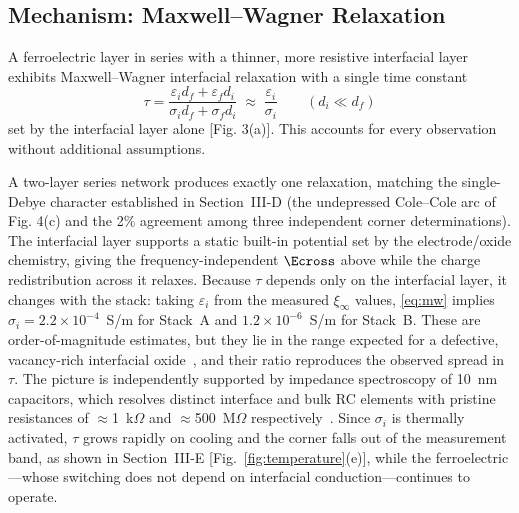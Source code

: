 \subsection{Mechanism: Maxwell--Wagner Relaxation}
A ferroelectric layer in series with a thinner, more resistive interfacial
layer exhibits Maxwell--Wagner interfacial relaxation with a single time
constant~\cite{jonscher1983,kremer2003}
\begin{equation}
\tau = \frac{\varepsilon_i d_f + \varepsilon_f d_i}
            {\sigma_i d_f + \sigma_f d_i}
     \;\approx\; \frac{\varepsilon_i}{\sigma_i}
     \qquad (d_i \ll d_f)
\label{eq:mw}
\end{equation}
set by the interfacial layer alone [Fig. 3(a)]. This
accounts for every observation without additional assumptions.

A two-layer series network produces exactly one relaxation, matching the
single-Debye character established in Section~III-D (the undepressed
Cole--Cole arc of Fig. 4(c) and the 2\% agreement among
three independent corner determinations). The interfacial layer supports a
static built-in potential set by the electrode/oxide chemistry, giving the
frequency-independent $\Ecross$ above while the charge redistribution across
it relaxes. Because $\tau$ depends only on the interfacial layer, it changes
with the stack: taking $\varepsilon_i$ from the measured $\xi_\infty$ values,
\eqref{eq:mw} implies $\sigma_i = 2.2\times10^{-4}$~S/m for Stack~A and
$1.2\times10^{-6}$~S/m for Stack~B. These are order-of-magnitude estimates,
but they lie in the range expected for a defective, vacancy-rich interfacial
oxide~\cite{kim2023vacancy,segantini2023strain,koroleva2022,iung2025}, and
their ratio reproduces the observed spread in $\tau$. The picture is
independently supported by impedance spectroscopy of 10~nm \hzo{} capacitors,
which resolves distinct interface and bulk RC elements with pristine
resistances of $\approx$1~k$\Omega$ and $\approx$500~M$\Omega$
respectively~\cite{alcala2023}. Since $\sigma_i$ is thermally activated,
$\tau$ grows rapidly on cooling and the corner falls out of the measurement
band, as shown in Section~III-E [Fig.~\ref{fig:temperature}(e)], while the
ferroelectric---whose switching does not depend on interfacial
conduction---continues to operate.


